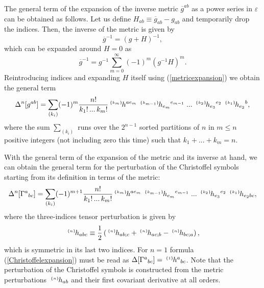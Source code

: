 \documentclass[aps,prd,showpacs]{revtex4}
\newcommand{\pert}[2]{{}^{\mbox{\,\tiny $\{#1\}\!$}}{#2}}
\newcommand{\h}[1]{{}^{\mbox{\,\tiny $\{#1\}\!$}}h}
\begin{document}
The general term of the expansion of the inverse metric $\overline{g}^{ab}$
as a power series in $\varepsilon$ can be obtained as follows.
Let us define $H_{ab}\equiv\overline{g}_{ab}-g_{ab}$ and temporarily drop
the indices. Then, the inverse of the metric is given by
\begin{equation}
\overline g^{-1}=(g+H)^{-1},
\end{equation}
which can be expanded around $H=0$ as
\begin{equation}
\overline g^{-1}=g^{-1}\sum_{m=0}^{\infty}(-1)^m(g^{-1}H)^m.
\end{equation}
Reintroducing indices and expanding $H$ itself using (\ref{metricexpansion})
we obtain the general term
\begin{equation}\label{invmetricexpansion}
\Delta^n[g^{ab}] =
\sum_{(k_i)} (-1)^m\frac{n!}{k_1!\,...\,k_m!} \h{k_m}^{ae_m}\;\h{k_{m-1}}_{e_m}{}^{e_{m-1}}\;...\;
\h{k_2}_{e_3}{}^{e_2}\;\h{k_1}_{e_2}{}^b,
\end{equation}
where the sum $\sum_{(k_i)}$ runs over the $2^{n-1}$ sorted partitions of
$n$ in $m\le n$ positive integers (not including zero this time) such that
$k_1+...+k_m=n$.

With the general term of the expansion of the metric and its inverse at
hand, we can obtain the general term for the perturbation of the
Christoffel symbols starting from its definition in terms of the metric:
\begin{equation} \label{Christoffelexpansion}
\Delta^n[\Gamma^a{}_{bc}] =
\sum_{(k_i)} (-1)^{m+1}\frac{n!}{k_1!\,...\,k_m!}
\h{k_m}^{ae_m}\;
\h{k_{m-1}}_{e_m}{}^{e_{m-1}}\;...\;
\h{k_{2}}_{e_3}{}^{e_2}\;\h{k_1}_{e_2bc},
\end{equation}
where the three-indices tensor perturbation is given by
\begin{equation}
\h{n}_{abc} \equiv \frac{1}{2}\left( \h{n}_{ab ;c}
+ \h{n}_{ac ;b} - \h{n}_{bc ;a}\right),
\end{equation}
which is symmetric in its last two indices. For $n=1$ formula 
(\ref{Christoffelexpansion}) must be read
as $\Delta[\Gamma^a{}_{bc}]=\h{1}^{a}{}_{bc}$. Note that the perturbation
of the Christoffel symbols is constructed from the metric perturbations
$\pert{n}{h}_{ab}$ and their first covariant derivative at all orders.
\end{document}
